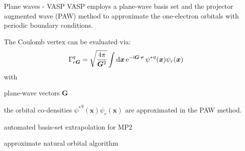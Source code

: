 \begin{block}{\large Plane waves - VASP}
  VASP employs a plane-wave basis set and the projector augmented wave (PAW) method
  to approximate the one-electron orbitals with periodic boundary conditions.%
  ~\cite{blochl1994,kresse1996efficiency}

  The Coulomb vertex can be evaluated via:
  \begin{equation*}\label{pw-vertex}
    \Gamma_{r \bm{G}}^{q}
    =
    \sqrt{\frac{4\pi}{{\bm G}^2}}
    \int{\rm d}{\bm x}\,
    {\rm e}^{-{\rm i}{\bm G}\cdot{\bm r}}\,
    {\psi^\ast}^q({\bm x}) \psi_r({\bm x})\,
  \end{equation*}
  with
  \begin{compactitem}
  \item plane-wave vectors $\bm{G}$
  \item the orbital co-densities ${\psi^\ast}^q({\bm x})\psi_r({\bm x})$
    are approximated in the PAW method.
  \item
    automated basis-set extrapolation for MP2
  \item
    approximate natural orbital algorithm~\cite{gruneis2011,gruber2018,irmler2021}
  \end{compactitem}
  \phantom{lala}
\end{block}

